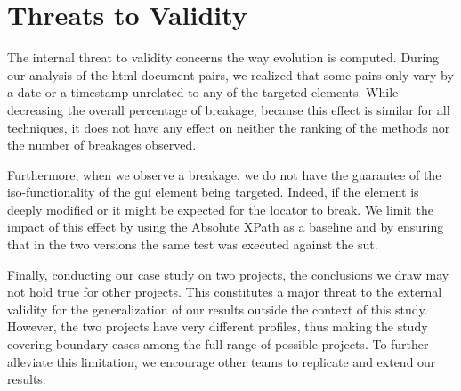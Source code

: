 \section{Threats to Validity}

The internal threat to validity concerns the way evolution is computed. During our analysis of the \gls{html} document pairs, we realized that some pairs only vary by a date or a timestamp unrelated to any of the targeted elements. While decreasing the overall percentage of breakage, because this effect is similar for all techniques, it does not have any effect on neither the ranking of the methods nor the number of breakages observed.

Furthermore, when we observe a breakage, we do not have the guarantee of the iso-functionality of the \gls{gui} element being targeted. Indeed, if the element is deeply modified or it might be expected for the locator to break. We limit the impact of this effect by using the Absolute XPath as a baseline and by ensuring that in the two versions the same test was executed against the \gls{sut}.

Finally, conducting our case study on two projects, the conclusions we draw may not hold true for other projects. This constitutes a major threat to the external validity for the generalization of our results outside the context of this study. However, the two projects have very different profiles, thus making the study covering boundary cases among the full range of possible projects. To further alleviate this limitation, we encourage other teams to replicate and extend our results.

